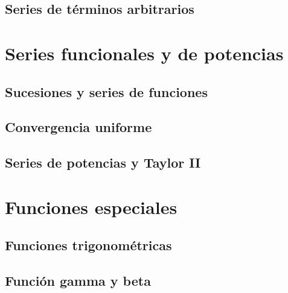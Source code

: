 \documentclass{article}
\begin{document}
\subsection{Series de términos arbitrarios}





\section{Series funcionales y de potencias}

\subsection{Sucesiones y series de funciones}

\subsection{Convergencia uniforme}

\subsection{Series de potencias y Taylor II}



\section{Funciones especiales}

\subsection{Funciones trigonométricas}

\subsection{Función gamma y beta}
\end{document}
